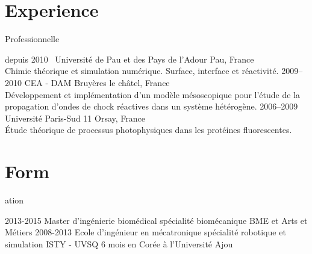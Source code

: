 \documentclass{cv-style}     %
\begin{document}
\section{Experience}{ Professionnelle}

\begin{entrylist}
\entry
  {depuis 2010~}
  {Université de Pau et des Pays de l'Adour}
  {Pau, France}
  {\\
   Chimie théorique et simulation numérique.
   Surface, interface et réactivité.}
\entry
  {2009--2010}
  {CEA - DAM}
  {Bruyères le châtel, France}
  {
  \\
  Développement et implémentation d'un modèle mésoscopique pour l'étude de la propagation
  d'ondes de chock réactives dans un système hétérogène.
  }
\entry
  {2006--2009}
  {Université Paris-Sud 11}
  {Orsay, France}
  {
  \\
  Étude théorique de processus photophysiques dans les protéines fluorescentes.
  }
\end{entrylist}


\section{Form}{ation}

\begin{entrylist}
\entry
{2013-2015}
{Master d'ingénierie biomédical {\normalfont spécialité biomécanique}}
{BME et Arts et Métiers}
{}
\entry
{2008-2013}
{Ecole d'ingénieur en mécatronique {\normalfont spécialité robotique et simulation}}
{ISTY - UVSQ}
{6 mois en Corée à l'Université Ajou}
\end{entrylist}
\end{document}
